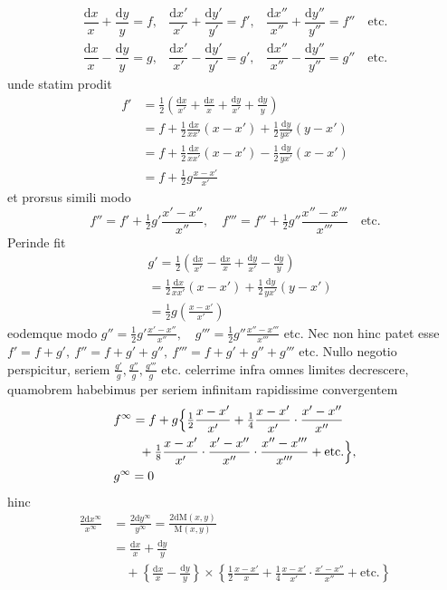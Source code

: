 \[
\begin{array}{lll}
\dfrac{\mathrm{d}x}{x}+\dfrac{\mathrm{d}y}{y}=f,&
\dfrac{\mathrm{d}x'}{x'}+\dfrac{\mathrm{d}y'}{y'}=f',&
\dfrac{\mathrm{d}x''}{x''}+\dfrac{\mathrm{d}y''}{y''}=f''\quad\mathrm{etc.}\\[7pt]
\dfrac{\mathrm{d}x}{x}-\dfrac{\mathrm{d}y}{y}=g,&
\dfrac{\mathrm{d}x'}{x'}-\dfrac{\mathrm{d}y'}{y'}=g',&
\dfrac{\mathrm{d}x''}{x''}-\dfrac{\mathrm{d}y''}{y''}=g''\quad\mathrm{etc.}
\end{array}
\]
unde statim prodit
\[
\begin{aligned}
f'&=\tfrac12\left(\frac{\mathrm{d}x}{x'}+\frac{\mathrm{d}x}{x}+\frac{\mathrm{d}y}{x'}+\frac{\mathrm{d}y}{y}\right)\\&=f+\tfrac12\frac{\mathrm{d}x}{xx'}(x-x')+\tfrac12\frac{\mathrm{d}y}{yx'}(y-x')\\[7pt]
&=f+\tfrac12\frac{\mathrm{d}x}{xx'}(x-x')-\tfrac12\frac{\mathrm{d}y}{yx'}(x-x')\\&=f+\tfrac12 g\frac{x-x'}{x'}
\end{aligned}
\]
et prorsus simili modo
\[
f''=f'+\tfrac12 g'\frac{x'-x''}{x''},\quad
f'''=f''+\tfrac12 g''\frac{x''-x'''}{x'''}\quad\mathrm{etc.}
\]
Perinde fit
\[
\begin{aligned}&g'=\tfrac12\left(\frac{\mathrm{d}x}{x'}-\frac{\mathrm{d}x}{x}+\frac{\mathrm{d}y}{x'}-\frac{\mathrm{d}y}{y}\right)\\&=\tfrac12\frac{\mathrm{d}x}{xx'}(x-x')+\tfrac12\frac{\mathrm{d}y}{yx'}(y-x')\\&=\tfrac12 g\left(\frac{x-x'}{x'}\right)\end{aligned}
\]
eodemque modo \(g''=\tfrac12 g'\frac{x'-x''}{x''},\quad
g'''=\tfrac12 g''\frac{x''-x'''}{x'''}\) etc.
Nec non hinc patet esse
\(f'=f+g',\ f''=f+g'+g'',\ f'''=f+g'+g''+g'''\) etc.
Nullo negotio perspicitur, seriem
\(\frac{g'}{g},\frac{g''}{g},\frac{g'''}{g}\) etc.
celerrime infra omnes limites decrescere, quamobrem habebimus per seriem infinitam rapidissime convergentem
\[
\begin{aligned}&f^\infty=f+g\Bigl\{\tfrac12\frac{x-x'}{x'}
+\tfrac14\frac{x-x'}{x'}\cdot\frac{x'-x''}{x''}\\&\qquad+\tfrac18\frac{x-x'}{x'}\cdot\frac{x'-x''}{x''}\cdot\frac{x''-x'''}{x'''}
+\mathrm{etc.}\Bigr\},\\&g^\infty=0\end{aligned}
\]
hinc
\[
\begin{aligned}
\frac{2\mathrm{d}x^\infty}{x^\infty}
&=\frac{2\mathrm{d}y^\infty}{y^\infty}
=\frac{2\mathrm{d}\mathrm{M}(x,y)}{\mathrm{M}(x,y)}\\[7pt]
&=\frac{\mathrm{d}x}{x}+\frac{\mathrm{d}y}{y}\\&\quad+\left\{\frac{\mathrm{d}x}{x}-\frac{\mathrm{d}y}{y}\right\}\times
\left\{\tfrac12\frac{x-x'}{x}+\tfrac14\frac{x-x'}{x'}\cdot\frac{x'-x''}{x''}+\mathrm{etc.}\right\}
\end{aligned}
\]
